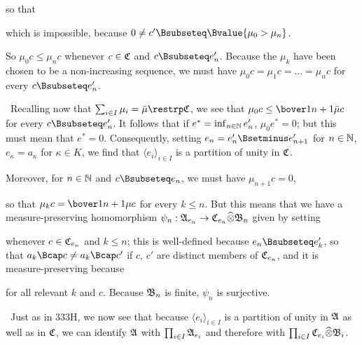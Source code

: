 {

\noindent so that


\noindent which is impossible, because
$0\ne c'\Bsubseteq\Bvalue{\mu_0>\mu_n}$.\ \Bang\Qed

So $\mu_0c\le\mu_nc$ whenever $c\in\frak C$ and $c\Bsubseteq e'_n$.
Because the $\mu_k$ have been chosen to be a non-increasing sequence, we
must have $\mu_0c=\mu_1c=\ldots=\mu_nc$ for every $c\Bsubseteq e'_n$.

\medskip

\quad\grheade\ Recalling now that
$\sum_{i\in I}\mu_i=\bar\mu\restrp\frak C$, we see that
$\mu_0c\le\bover1{n+1}\bar\mu c$ for every $c\Bsubseteq e'_n$.   It
follows that if $e^*=\inf_{n\in\Bbb N}e'_n$, $\mu_0e^*=0$;
but this must mean that $e^*=0$.   Consequently, setting
$e_n=e'_n\Bsetminus e'_{n+1}$ for $n\in\Bbb N$,
$e_{\kappa}=a_{\kappa}$ for $\kappa\in K$,  we find that
$\langle e_i\rangle_{i\in I}$ is a partition of unity in $\frak C$.

Moreover, for $n\in\Bbb N$ and $c\Bsubseteq e_n$, we must have
$\mu_{n+1}c=0$,


\noindent so that $\mu_kc=\bover1{n+1}\mu c$ for every $k\le n$.   But this
means that we have a measure-preserving homomorphism
$\psi_n:\frak A_{e_n}\to\frak C_{e_n}\widehat{\otimes}\frak B_n$ given
by setting


\noindent whenever $c\in\frak C_{e_n}$ and $k\le n$;  this is well-defined
because $e_n\Bsubseteq e'_k$, so that $a_k\Bcap c\ne a_k\Bcap c'$ if
$c$, $c'$ are distinct members of $\frak C_{e_n}$, and it is
measure-preserving because


\noindent for all relevant $k$ and $c$.    Because $\frak B_n$ is
finite, $\psi_n$ is surjective.

\medskip

\quad\grheadz\ Just as in 333H, we now see that because $\langle
e_i\rangle_{i\in I}$ is a partition of unity in $\frak A$ as well as in
$\frak C$, we can identify $\frak A$ with $\prod_{i\in I}\frak A_{e_i}$
and therefore with $\prod_{i\in I}\frak C_{e_i}\widehat{\otimes}\frak
B_i$.

}
